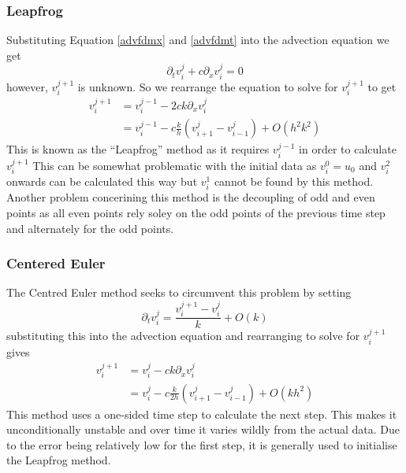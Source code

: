 \subsubsection{Leapfrog}
Substituting Equation \ref{advfdmx} and \ref{advfdmt} into the advection equation we get
\begin{equation}
  \partial_tv_i^j + c\partial_xv_i^j = 0
\end{equation}
however, $v_i^{j+1}$ is unknown. So we rearrange the equation to solve for $v_i^{j+1}$ to get
\begin{align*}
    v_i^{j+1} &= v_i^{j-1} - 2ck\partial_xv_i^j \\
	      &= v_i^{j-1} - c\frac{k}{h}(v_{i+1}^j - v_{i-1}^j) + O(h^2k^2)
\end{align*}
This is known as the ``Leapfrog'' method as it requires $v_i^{j-1}$ in order to calculate $v_i^{j+1}$ This can be somewhat problematic with the initial data as $v_i^0=u_0$ and $v_i^2$ onwards can be calculated this way but $v_i^1$ cannot be found by this method. Another problem concerining this method is the decoupling of odd and even points as all even points rely soley on the odd points of the previous time step and alternately for the odd points.
\subsubsection{Centered Euler}
The Centred Euler method seeks to circumvent this problem by setting
\begin{equation}
\partial_tv_i^j = \frac{v_i^{j+1} - v_i^j}{k} + O(k)
\end{equation}
substituting this into the advection equation and rearranging to solve for $v_i^{j+1}$ gives
\begin{align*}
    v_i^{j+1} &= v_i^j - ck\partial_xv_i^j \\
	      &= v_i^j - c\frac{k}{2h}(v_{i+1}^j - v_{i-1}^j) + O(kh^2)
\end{align*}
This method uses a one-sided time step to calculate the next step. This makes it unconditionally unstable and over time it varies wildly from the actual data. Due to the error being relatively low for the first step, it is generally used to initialise the Leapfrog method.
